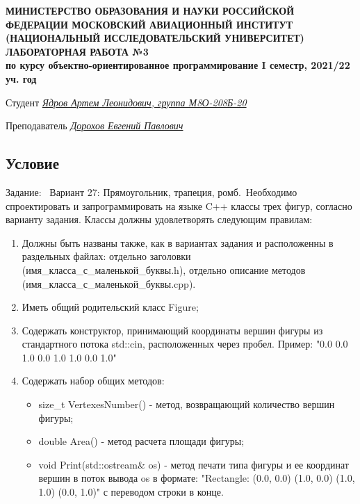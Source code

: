 \documentclass[12pt]{article}
\begin{document}
\begin{titlepage}
\begin{center}
\textbf{МИНИСТЕРСТВО ОБРАЗОВАНИЯ И НАУКИ РОССИЙСКОЙ ФЕДЕРАЦИИ
\medskip
МОСКОВСКИЙ АВИАЦИОННЫЙ ИНСТИТУТ
(НАЦИОНАЛЬНЫЙ ИССЛЕДОВАТЕЛЬСКИЙ УНИВЕРСИТЕТ)
\vfill\vfill
{\Huge ЛАБОРАТОРНАЯ РАБОТА №3} \\
по курсу объектно-ориентированное программирование
I семестр, 2021/22 уч. год}
\end{center}
\vfill

Студент \uline{\it {Ядров Артем Леонидович, группа М8О-208Б-20}\hfill}

Преподаватель \uline{\it {Дорохов Евгений Павлович}\hfill}

\vfill
\end{titlepage}

\subsection*{Условие}

Задание: \
Вариант 27: Прямоугольник, трапеция, ромб.\
Необходимо спроектировать и запрограммировать на языке C++ классы трех фигур, согласно варианту задания. Классы должны удовлетворять следующим правилам:
\begin{enumerate}
\item Должны быть названы также, как в вариантах задания и расположенны в раздельных файлах: отдельно заголовки (имя\_класса\_с\_маленькой\_буквы.h), отдельно описание методов (имя\_класса\_с\_маленькой\_буквы.cpp).
\item Иметь общий родительский класс Figure;
\item Содержать конструктор, принимающий координаты вершин фигуры из стандартного потока std::cin, расположенных через пробел. Пример: "0.0 0.0 1.0 0.0 1.0 1.0 0.0 1.0"
\item Содержать набор общих методов:
\begin{itemize}
    \item size\_t VertexesNumber() - метод, возвращающий количество вершин фигуры;
    \item double Area() - метод расчета площади фигуры;
    \item void Print(std::ostream& os) - метод печати типа фигуры и ее координат вершин в поток вывода os в формате: "Rectangle: (0.0, 0.0) (1.0, 0.0) (1.0, 1.0) (0.0, 1.0)" с переводом строки в конце.
\end{itemize}
\end{enumerate}
\end{document}
